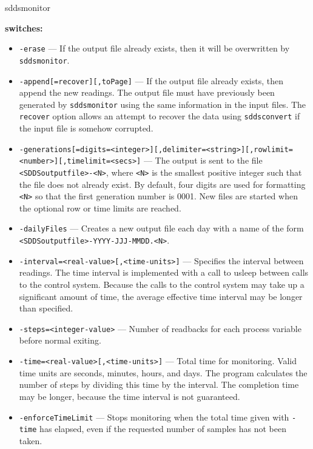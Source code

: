 \begin{sddsprog}{sddsmonitor}
\item \textbf{switches:}
\begin{itemize}
  \item {\tt -erase} --- If the output file already exists, then it will be overwritten
                by \verb+sddsmonitor+.
  \item {\tt -append[=recover][,toPage]} --- If the output file already exists, then append the new readings.
                The output file must have previously been generated by \verb+sddsmonitor+ using the same
                information in the input files. The \verb+recover+ option allows an attempt
                to recover the data using \verb+sddsconvert+ if the input file is somehow corrupted.
  \item {\verb+-generations[=digits=<integer>][,delimiter=<string>][,rowlimit=<number>][,timelimit=<secs>]+} ---
                The output is sent to the file \verb+<SDDSoutputfile>-<N>+, where \verb+<N>+
                is the smallest positive integer such that the file does not already
                exist. By default, four digits are used for formatting \verb+<N>+ so that
                the first generation number is 0001. New files are started when the
                optional row or time limits are reached.
  \item {\tt -dailyFiles} --- Creates a new output file each day with a name
                of the form \verb+<SDDSoutputfile>-YYYY-JJJ-MMDD.<N>+.
  \item {\tt -interval=<real-value>[,<time-units>]} --- Specifies the interval between readings. The time
                interval is implemented with a call to usleep between calls to the control system.
                Because the calls to the control system may take up a significant amount of time, the average
                effective time interval may be longer than specified.
  \item {\tt -steps=<integer-value>} --- Number of readbacks for each process variable before normal exiting.
  \item {\tt -time=<real-value>[,<time-units>]} --- Total time for monitoring. Valid time units are
                seconds, minutes, hours, and days. The program calculates the number of steps by dividing this time
                by the interval. The completion time may be longer, because the time interval is not guaranteed.
  \item {\tt -enforceTimeLimit} --- Stops monitoring when the total time given with \verb+-time+
                has elapsed, even if the requested number of samples has not been taken.

\end{itemize}
\end{sddsprog}
